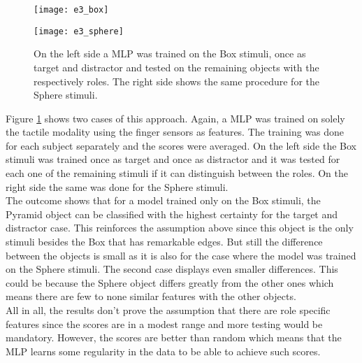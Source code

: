 \begin{figure}
	\begin{minipage}[t]{0.49\textwidth}
		\texttt{[image: e3\_box]}
	\end{minipage}
	\hspace{\fill}
	\begin{minipage}[t]{0.49\textwidth}
		\texttt{[image: e3\_sphere]}
	\end{minipage}
	\caption{On the left side a MLP was trained on the Box stimuli, once as target and distractor and tested on the remaining objects with the respectively roles. The right side shows the same procedure for the Sphere stimuli.}
	\label{e3}
\end{figure}

Figure \ref{e3} shows two cases of this approach. Again, a MLP was trained on solely the tactile modality using the finger sensors as features. The training was done for each subject separately and the scores were averaged. On the left side the Box stimuli was trained once as target and once as distractor and it was tested for each one of the remaining stimuli if it can distinguish between the roles. On the right side the same was done for the Sphere stimuli.\\
The outcome shows that for a model trained only on the Box stimuli, the Pyramid object can be classified with the highest certainty for the target and distractor case. This reinforces the assumption above since this object is the only stimuli besides the Box that has remarkable edges. But still the difference between the objects is small as it is also for the case where the model was trained on the Sphere stimuli. The second case displays even smaller differences. This could be because the Sphere object differs greatly from the other ones which means there are few to none similar features with the other objects.\\
All in all, the results don't prove the assumption that there are role specific features since the scores are in a modest range and more testing would be mandatory. However, the scores are better than random which means that the MLP learns some regularity in the data to be able to achieve such scores. 